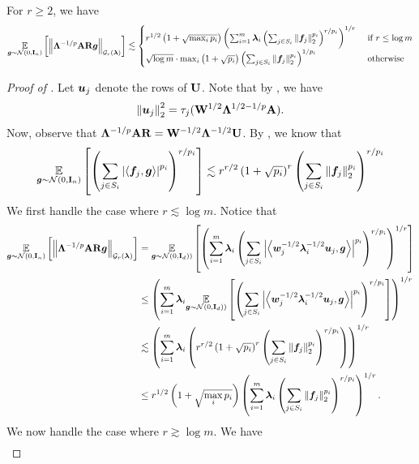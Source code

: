 \documentclass[11pt]{article}
\numberwithin{equation}{section}
\begin{document}
\begin{lemma}
\label{lemma:khintchine}
For $r \ge 2$, we have
\begin{align*}
    \underset{\bm{g}\sim\mathcal{N}(0,\mathbf{I}_n)}{\mathbb{E}}\left[\left\lVert \mathbf{\Lambda}^{-1/p}\mathbf{A}\mathbf{R}\bm{g} \right\rVert_{\mathcal{G}_{r}(\bm{\lambda})}\right] \lesssim \begin{cases} r^{1/2}\left(1+\sqrt{\max_i p_i}\right)\left(\sum_{i=1}^m \bm{\lambda}_i \left(\sum_{j \in S_i} \left\lVert \bm{f}_j \right\rVert_{2}^{p_i}\right)^{r/p_i}\right)^{1/r} & \text{ if } r \le \log m \\ \sqrt{\log m} \cdot \max_i \left(1+\sqrt{p_i}\right)\left(\sum_{j \in S_i} \left\lVert \bm{f}_j \right\rVert_{2}^{p_i}\right)^{1/p_i} & \text{ otherwise} \end{cases}
\end{align*}
\end{lemma}
\begin{proof}[Proof of ]
Let $\bm{u}_j$ denote the rows of $\mathbf{U}$. Note that by , we have
\begin{align*}
    \left\lVert \bm{u}_j \right\rVert_2^2 = \tau_j(\mathbf{W}^{1/2}\mathbf{\Lambda}^{1/2-1/p}\mathbf{A}).
\end{align*}
Now, observe that $\mathbf{\Lambda}^{-1/p}\mathbf{A}\mathbf{R} = \mathbf{W}^{-1/2}\mathbf{\Lambda}^{-1/2}\mathbf{U}$. By , we know that
\begin{align*}
    \underset{\bm{g}\sim\mathcal{N}(0,\mathbf{I}_n)}{\mathbb{E}}\left[\left(\sum_{j \in S_i} \left\lvert \left\langle \bm{f}_j,\bm{g} \right\rangle \right\rvert^{p_i}\right)^{r/p_i}\right] \lesssim r^{r/2}\left(1+\sqrt{p_i}\right)^r\left(\sum_{j \in S_i} \left\lVert \bm{f}_j \right\rVert_{2}^{p_i}\right)^{r/p_i}
\end{align*}
We first handle the case where $r \lesssim \log m$. Notice that
\begin{align*}
    \underset{\bm{g}\sim\mathcal{N}(0,\mathbf{I}_n)}{\mathbb{E}}\left[\left\lVert \mathbf{\Lambda}^{-1/p}\mathbf{A}\mathbf{R}\bm{g} \right\rVert_{\mathcal{G}_{r}(\bm{\lambda})}\right] &= \underset{\bm{g}\sim\mathcal{N}(0,\mathbf{I}_d))}{\mathbb{E}}\left[\left(\sum_{i=1}^m \bm{\lambda}_i\left(\sum_{j \in S_i}\left\lvert \left\langle \bm{w}_j^{-1/2}\bm{\lambda}_i^{-1/2}\bm{u}_j,\bm{g} \right\rangle \right\rvert^{p_i}\right)^{r/p_i}\right)^{1/r}\right] \\
    &\le \left(\sum_{i=1}^m \bm{\lambda}_i\underset{\bm{g}\sim\mathcal{N}(0,\mathbf{I}_d))}{\mathbb{E}}\left[\left(\sum_{j \in S_i}\left\lvert \left\langle \bm{w}_j^{-1/2}\bm{\lambda}_i^{-1/2}\bm{u}_j,\bm{g} \right\rangle \right\rvert^{p_i}\right)^{r/p_i}\right]\right)^{1/r} \\
    &\lesssim \left(\sum_{i=1}^m \bm{\lambda}_i\left(r^{r/2}\left(1+\sqrt{p_i}\right)^r\left(\sum_{j \in S_i} \left\lVert \bm{f}_j \right\rVert_{2}^{p_i}\right)^{r/p_i}\right)\right)^{1/r} \\
    &\le r^{1/2}\left(1+\sqrt{\max_i p_i}\right)\left(\sum_{i=1}^m \bm{\lambda}_i \left(\sum_{j \in S_i} \left\lVert \bm{f}_j \right\rVert_{2}^{p_i}\right)^{r/p_i}\right)^{1/r}.
\end{align*}
We now handle the case where $r \gtrsim \log m$. We have
\begin{align*}

\end{align*}
\end{proof}
\end{document}
